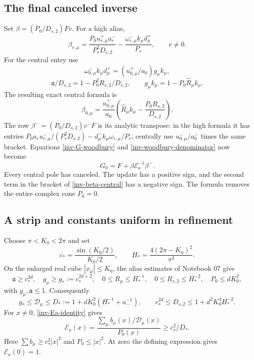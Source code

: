 \documentclass[11pt]{article}
\theoremstyle{remark}
\begin{document}
\subsection{The final canceled inverse}

Set $\beta=(P_0/D_{s,2})Fv$. For a high alias,
\begin{equation}\label{inv-beta-high}
 \beta_{r,\mu}
 =\frac{P_0u_{r,\mu}^+a_r^-}{P_r^2D_{s,2}}
 -\frac{\omega_{r,\mu}^-k_\mu d_\mu^+}{P_r},
 \qquad r\ne0.
\end{equation}
For the central entry use
\[
 \omega_{0,\mu}^-k_\mu d_\mu^+
 =(u_{0,\mu}^+/a_0)g_\mu k_\mu,
\]
\[
 \mathfrak a/D_{s,2}=1-P_0^2R_{s,2}/D_{s,2},\qquad
 g_\mu k_\mu=1-P_0\widehat R_\mu k_\mu.
\]
The resulting exact central formula is
\begin{equation}\label{inv-beta-central}
 \beta_{0,\mu}=
 \frac{u_{0,\mu}^+}{a_0}
 \left(\widehat R_\mu k_\mu
                  -\frac{P_0R_{s,2}}{D_{s,2}}\right).
\end{equation}
The row $\beta^-=(P_0/D_{s,2})v^-F$ is its analytic transpose:
in the high formula it has entries
$P_0a_ru_{r,\mu}^-/(P_r^2D_{s,2})
-d_\mu^-k_\mu\omega_{r,\mu}/P_r$; centrally use
$u_{0,\mu}^-/a_0^-$ times the same bracket.
Equations \eqref{inv-G-woodbury} and
\eqref{inv-woodbury-denominator} now become
\begin{equation}\label{inv-final-formula}
 \boxed{\displaystyle G_0=F+\beta\mathcal E_a^{-1}\beta^-.}
\end{equation}
Every central pole has canceled. The update has a positive sign, and
the second term in the bracket of \eqref{inv-beta-central} has a
negative sign. The formula removes the entire complex cone $P_0=0$.

\subsection{A strip and constants uniform in refinement}

Choose $\pi<K_0<2\pi$ and set
\[
 c_* =\frac{\sin(K_0/2)}{K_0/2},\qquad
 H_* =\frac{4(2\pi-K_0)^2}{\pi^2}.
\]
On the enlarged real cube $|x_\mu|\le K_0$, the alias estimates of
Notebook 07 give
\[
 \mathfrak a\ge c_*^{2d},\quad
 g_\mu\ge g_*:=c_*^{2d+2},\quad
 0\le R_\mu\le H_*^{-1},\quad
 0\le R_{s,2}\le H_*^{-2},\quad P_0\le dK_0^2,
\]
with $g_\mu,\mathfrak a\le1$. Consequently
\[
 g_*\le\mathcal D_\mu\le
 D_*:=1+dK_0^2(H_*^{-1}+a_-^{-1}),\qquad
 c_*^{2d}\le D_{s,2}\le1+d^2K_0^4H_*^{-2}.
\]
For $x\ne0$, \eqref{inv-Ea-identity} gives
\begin{equation}\label{inv-Ea-lower}
 \mathcal E_a(x)=
 \frac{\sum_\mu b_\mu(x)/\mathcal D_\mu(x)}{P_0(x)}
 \ge c_*^2/D_*.
\end{equation}
Here $\sum b_\mu\ge c_*^2|x|^2$ and $P_0\le|x|^2$.
At zero the defining expression gives $\mathcal E_a(0)=1$.
\end{document}

